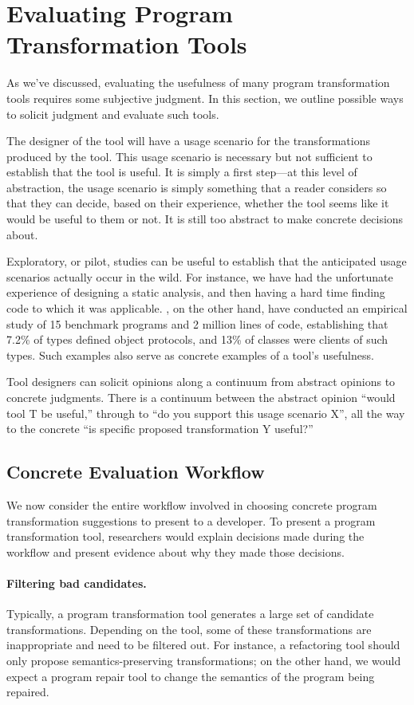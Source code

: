 \section{Evaluating Program Transformation Tools}
\label{sec:how-to-evaluate}
As we've discussed, evaluating the usefulness of many program
transformation tools requires some subjective judgment. In this
section, we outline possible ways to solicit judgment and evaluate
such tools.

The designer of the tool will have a usage scenario for the
transformations produced by the tool. This usage scenario is necessary
but not sufficient to establish that the tool is useful. It is simply
a first step---at this level of abstraction, the usage scenario is
simply something that a reader considers so that they can decide,
based on their experience, whether the tool seems like it would be
useful to them or not.  It is still too abstract to make concrete
decisions about.

Exploratory, or pilot, studies can be useful to establish that the
anticipated usage scenarios actually occur in the wild. For instance,
we have had the unfortunate experience of designing a static analysis,
and then having a hard time finding code to which it was
applicable. \cite{beckman11:_empir_study_objec_protoc_wild}, on the
other hand, have conducted an empirical study of 15 benchmark programs
and 2 million lines of code, establishing that 7.2\% of types defined
object protocols, and 13\% of classes were clients of such types.
Such examples also serve as concrete examples of a tool's usefulness.

Tool designers can solicit opinions along a continuum from abstract
opinions to concrete judgments. There is a continuum between the
abstract opinion ``would tool T be useful,'' through to ``do you
support this usage scenario X'', all the way to the concrete ``is
specific proposed transformation Y useful?''

\subsection{Concrete Evaluation Workflow}
We now consider the entire workflow involved in choosing concrete
program transformation suggestions to present to a developer. To present
a program transformation tool, researchers would explain decisions made during
the workflow and present evidence about why they made those decisions.

\paragraph{Filtering bad candidates.} Typically, a
program transformation tool generates a large set of candidate
transformations. Depending on the tool, some of these transformations
are inappropriate and need to be filtered out. For instance, a
refactoring tool should only propose semantics-preserving
transformations; on the other hand, we would expect a program repair
tool to change the semantics of the program being repaired.

